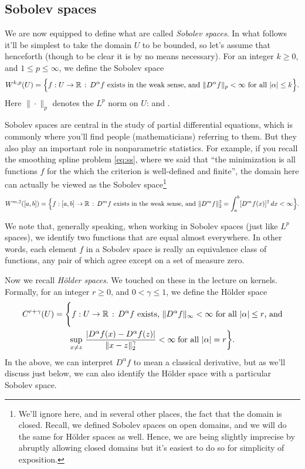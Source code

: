 \documentclass{article}
\DeclareMathOperator*{\esssup}{ess\,sup}
\begin{document}
\subsection{Sobolev spaces}

We are now equipped to define what are called \emph{Sobolev spaces}. In what
follows it'll be simplest to take the domain $U$ to be bounded, so let's 
assume that henceforth (though to be clear it is by no means necessary). For an
integer $k \geq 0$, and $1 \leq p \leq \infty$, we define the Sobolev space    
\[
W^{k,p}(U) = \Big\{ f : U \to \mathbb{R} \,:\, \text{$D^\alpha f$ exists in the weak
  sense, and $\|D^\alpha f\|_p < \infty$ for all $|\alpha| \leq k$} \Big\}. 
\]
Here $\|\cdot\|_p$ denotes the $L^p$ norm on $U$:  and \smash{$\|f\|_\infty = \esssup_{x 
  \in U} \, |f(x)|$}.

Sobolev spaces are central in the study of partial differential equations, which
is commonly where you'll find people (mathematicians) referring to them. But
they also play an important role in nonparametric statistics. For example, if
you recall the smoothing spline problem \eqref{eq:ss}, where we said that ``the  
minimization is all functions $f$ for the which the criterion is well-defined
and finite'', the domain here can actually be viewed as the Sobolev
space\footnote{We'll ignore here, and in several other places, the fact that the 
  domain is closed. Recall, we defined Sobolev spaces on open domains, and we  
  will do the same for H{\"o}lder spaces as well. Hence, we are being slightly 
  imprecise by abruptly allowing closed domains but it's easiest to do so for
  simplicity of exposition.}  
\[
W^{m,2}([a,b]) = \Big\{ f : [a,b] \to \mathbb{R} \,:\, \text{$D^m f$ exists in the weak
  sense, and $\|D^m f\|_2^2 = \int_a^b [D^m f(x)]^2 \, dx < \infty$} \Big\}. 
\]

We note that, generally speaking, when working in Sobolev spaces (just like
$L^p$ spaces), we identify two functions that are equal almost everywhere. In 
other words, each element $f$ in a Sobolev space is really an equivalence class
of functions, any pair of which agree except on a set of measure zero.

Now we recall \emph{H{\"o}lder spaces}. We touched on these in the lecture on 
kernels. Formally, for an integer $r \geq 0$, and $0 < \gamma \leq 1$, we define
the H{\"o}lder space
\begin{multline*}
C^{r+\gamma}(U) = \Bigg\{ f : U \to \mathbb{R} \,:\, \text{$D^\alpha f$ exists,
  $\|D^\alpha f\|_\infty < \infty$ for all $|\alpha| \leq r$, and} \\   
  \sup_{x \not= z} \, \frac{|D^\alpha f(x) - D^\alpha f(z)|}{\|x-z\|_2^\gamma} < 
  \infty \; \text{for all $|\alpha| = r$} \bigg\}.   
\end{multline*}
In the above, we can interpret $D^\alpha f$ to mean a classical derivative, but
as we'll discuss just below, we can also identify the H{\"o}lder space with a
particular Sobolev space. 
\end{document}
